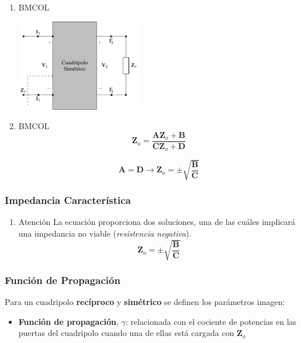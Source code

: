 \begin{enumerate}
\item \hfill{}\textsc{BMCOL}
\label{sec:org302b662}
\begin{center}
\includegraphics[height=4cm]{../figs/cuadripolo_impedancia_caracteristica.pdf}
\end{center}

\item \hfill{}\textsc{BMCOL}
\label{sec:orgc75359e}
\[
\mathbf{Z}_o = \frac{\mathbf{A} \mathbf{Z}_o + \mathbf{B}}{\mathbf{C}\mathbf{Z}_o + \mathbf{D}}
\]

\[
\mathbf{A} = \mathbf{D} \rightarrow \boxed{\mathbf{Z}_o = \pm \sqrt{\frac{\mathbf{B}}{\mathbf{C}}}}
\]
\end{enumerate}

\subsubsection{Impedancia Característica}
\label{sec:org7144bfc}

\begin{enumerate}
\item Atención
\label{sec:org9042c98}
La ecuación proporciona dos soluciones, una de las cuáles implicará una impedancia no viable (\emph{resistencia negativa}).
\[
\boxed{\mathbf{Z}_o = \pm \sqrt{\frac{\mathbf{B}}{\mathbf{C}}}}
\]
\end{enumerate}

\subsubsection{Función de Propagación}
\label{sec:orgf2ef1cc}
Para un cuadripolo \textbf{recíproco} y \textbf{simétrico} se definen los parámetros imagen:

\begin{itemize}
\item \textbf{Función de propagación}, \(\gamma\): relacionada con el cociente de potencias en las puertas del cuadripolo cuando una de ellas está cargada con \(\mathbf{Z}_o\)
\end{itemize}

